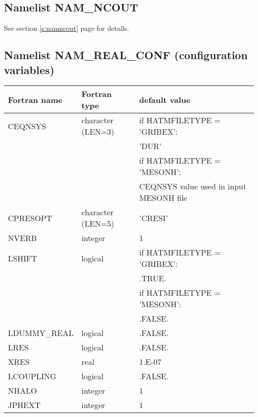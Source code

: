 \subsection{Namelist NAM\_NCOUT}
See section \ref{s:namncout} page \pageref{s:namncout} for details.

\subsection{Namelist NAM\_REAL\_CONF  (configuration variables)}

\begin{center}
\begin{tabular} {|l|l|l|}
\hline
Fortran name & Fortran type & default value\\
\hline
\hline
CEQNSYS       & character (LEN=3)  &if HATMFILETYPE = 'GRIBEX': \\
 & & \hspace*{0.5cm}'DUR' \\
              &                    & if HATMFILETYPE = 'MESONH': \\
 & & \hspace*{0.5cm} CEQNSYS value used in input MESONH file\\
CPRESOPT      & character (LEN=5)  & 'CRESI' \\
NVERB         & integer            & 1      \\
LSHIFT        & logical            & if HATMFILETYPE = 'GRIBEX':  \\
 & & \hspace*{0.5cm}.TRUE. \\
              &                    & if HATMFILETYPE = 'MESONH': \\
 & & \hspace*{0.5cm}.FALSE. \\
LDUMMY\_REAL  & logical            & .FALSE.                     \\
LRES          & logical            & .FALSE.                     \\
XRES          & real               & 1.E-07                      \\
LCOUPLING     & logical            & .FALSE.                     \\
NHALO      & integer        & 1      \\
JPHEXT     & integer        & 1      \\
\hline
\end{tabular}
\end{center}

